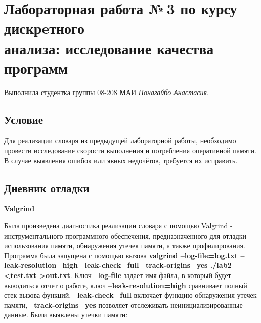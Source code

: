 \documentclass[12pt]{article}
\begin{document}
	
	\section*{Лабораторная работа №\,3 по курсу дискрeтного \\ анализа: исследование качества программ}
	
	\noindent Выполнила студентка группы 08-208 МАИ \textit{Понагайбо Анастасия}.
	
	\subsection*{Условие}
	
	Для реализации словаря из предыдущей лабораторной работы, необходимо провести исследование скорости выполнения и потребления оперативной памяти. В случае выявления ошибок или явных недочётов, требуется их исправить.
    
	\subsection*{Дневник отладки}
    \begin{center}
 	    \textbf{Valgrind}
    \end{center}
    Была произведена диагностика реализации словаря с помощью Valgrind - инструментального программного обеспечения, предназначенного для отладки использования памяти, обнаружения утечек памяти, а также профилирования.
    Программа была запущена с помощью вызова \textbf{valgrind --log-file=log.txt  --leak-resolution=high  --leak-check=full  --track-origins=yes  ./lab2  <test.txt  >out.txt}. Ключ \textbf{--log-file} задает имя файла, в который будет выводиться отчет о
    работе, ключ \textbf{--leak-resolution=high} сравнивает полный стек вызова функций, \textbf{--leak-check=full} включает функцию обнаружения утечек памяти, \textbf{--track-origins=yes} позволяет отслеживать неинициализированные данные.
    Были выявлены утечки памяти:
\end{document}
